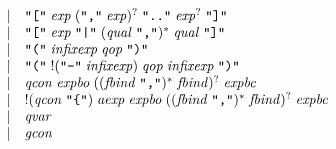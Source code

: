 \begin{align*}
\begin{array}{rcl}
    & \mid & \text{\texttt{\textquotedbl[\textquotedbl}}\; \mathit{exp}\; (\text{\texttt{\textquotedbl,\textquotedbl}}\; \mathit{exp})^?\; \text{\texttt{\textquotedbl..\textquotedbl}}\; \mathit{exp}^?\; \text{\texttt{\textquotedbl]\textquotedbl}} \\
    & \mid & \text{\texttt{\textquotedbl[\textquotedbl}}\; \mathit{exp}\; \text{\texttt{\textquotedbl|\textquotedbl}}\; (\mathit{qual}\; \text{\texttt{\textquotedbl,\textquotedbl}})^*\; \mathit{qual}\; \text{\texttt{\textquotedbl]\textquotedbl}} \\
    & \mid & \text{\texttt{\textquotedbl(\textquotedbl}}\; \mathit{infixexp}\; \mathit{qop}\; \text{\texttt{\textquotedbl)\textquotedbl}} \\
    & \mid & \text{\texttt{\textquotedbl(\textquotedbl}}\; ! (\text{\texttt{\textquotedbl-\textquotedbl}}\; \mathit{infixexp})\; \mathit{qop}\; \mathit{infixexp}\; \text{\texttt{\textquotedbl)\textquotedbl}} \\
    & \mid & \mathit{qcon}\; \mathit{expbo}\; ((\mathit{fbind}\; \text{\texttt{\textquotedbl,\textquotedbl}})^*\; \mathit{fbind})^?\; \mathit{expbc} \\
    & \mid & !(\mathit{qcon}\; \text{\texttt{\textquotedbl\{\textquotedbl}})\; \mathit{aexp}\; \mathit{expbo}\; ((\mathit{fbind}\; \text{\texttt{\textquotedbl,\textquotedbl}})^*\; \mathit{fbind})^?\; \mathit{expbc} \\
    & \mid & \mathit{qvar} \\
    & \mid & \mathit{gcon}
  \end{array}
\end{align*}

